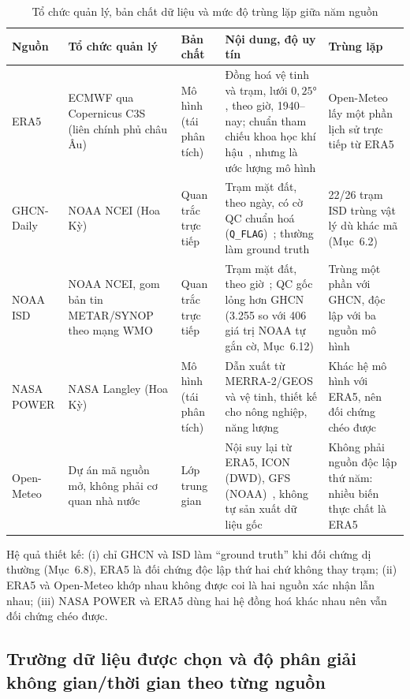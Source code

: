 \documentclass[12pt,a4paper]{report}
\begin{document}
\begin{table}[!htbp]
\centering\footnotesize
\caption{Tổ chức quản lý, bản chất dữ liệu và mức độ trùng lặp giữa năm nguồn}
\label{tab:source-credibility}
\begin{tabular}{@{}L{1.6cm}L{3.0cm}L{1.8cm}L{3.9cm}L{3.4cm}@{}}
\toprule
\textbf{Nguồn} & \textbf{Tổ chức quản lý} & \textbf{Bản chất} & \textbf{Nội dung, độ uy tín} & \textbf{Trùng lặp} \\
\midrule
ERA5 & ECMWF qua Copernicus C3S (liên chính phủ châu Âu) & Mô hình (tái phân tích) &
Đồng hoá vệ tinh và trạm, lưới $0{,}25°$, theo giờ, 1940--nay; chuẩn tham chiếu khoa học khí hậu~\cite{hersbach2020era5}, nhưng là ước lượng mô hình &
Open-Meteo lấy một phần lịch sử trực tiếp từ ERA5 \\
GHCN-Daily & NOAA NCEI (Hoa Kỳ) & Quan trắc trực tiếp &
Trạm mặt đất, theo ngày, có cờ QC chuẩn hoá (\texttt{Q\_FLAG})~\cite{menne2012ghcnd}; thường làm ground truth &
22/26 trạm ISD trùng vật lý dù khác mã (Mục~6.2) \\
NOAA ISD & NOAA NCEI, gom bản tin METAR/SYNOP theo mạng WMO & Quan trắc trực tiếp &
Trạm mặt đất, theo giờ~\cite{smith2011isd}; QC gốc lỏng hơn GHCN (3.255 so với 406 giá trị NOAA tự gắn cờ, Mục~6.12) &
Trùng một phần với GHCN, độc lập với ba nguồn mô hình \\
NASA POWER & NASA Langley (Hoa Kỳ) & Mô hình (tái phân tích) &
Dẫn xuất từ MERRA-2/GEOS và vệ tinh, thiết kế cho nông nghiệp, năng lượng &
Khác hệ mô hình với ERA5, nên đối chứng chéo được \\
Open-Meteo & Dự án mã nguồn mở, không phải cơ quan nhà nước & Lớp trung gian &
Nội suy lại từ ERA5, ICON (DWD), GFS (NOAA)~\cite{openmeteo}, không tự sản xuất dữ liệu gốc &
Không phải nguồn độc lập thứ năm: nhiều biến thực chất là ERA5 \\
\bottomrule
\end{tabular}
\end{table}

Hệ quả thiết kế: (i) chỉ GHCN và ISD làm ``ground truth'' khi đối chứng dị thường (Mục~6.8), ERA5 là
đối chứng độc lập thứ hai chứ không thay trạm; (ii) ERA5 và Open-Meteo khớp nhau không được coi là hai
nguồn xác nhận lẫn nhau; (iii) NASA POWER và ERA5 dùng hai hệ đồng hoá khác nhau nên vẫn đối chứng chéo
được.

\subsection{Trường dữ liệu được chọn và độ phân giải không gian/thời gian theo từng nguồn}
\label{sec:source-fields}
\end{document}
